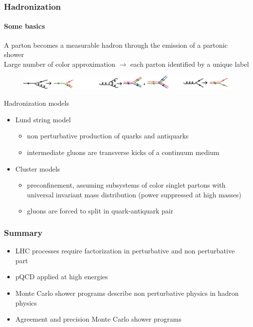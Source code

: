 \documentclass[aspectratio=43]{beamer}
\begin{document}
\begin{frame}
	
	\frametitle{Hadronization}
	\framesubtitle{Some basics}

	\footnotesize A parton becomes a measurable hadron through the emission of a partonic shower \\
	\footnotesize Large number of color approximation $\rightarrow$ each parton identified by a unique label \\

	\begin{figure}
		\includegraphics[width = 8.5 cm]{plots/hadronization.png}
	\end{figure}

	\footnotesize Hadronization models
	\begin{itemize}
		\item Lund string model
		\begin{itemize}
			\item \footnotesize non perturbative production of quarks and antiquarks
			\item \footnotesize intermediate gluons are transverse kicks of a continuum medium
		\end{itemize}
		\item Cluster models
		\begin{itemize}
			\item \footnotesize preconfinement, assuming subsystems of color singlet partons
			with universal invariant mass distribution (power suppressed at high masses)
			\item gluons are forced to split in quark-antiquark pair
		\end{itemize}
	\end{itemize}

\end{frame}

\begin{frame}

	\frametitle{Summary}

\begin{itemize}
	\item \footnotesize LHC processes require factorization in perturbative and non perturbative part
	\item \footnotesize pQCD applied at high energies
	\item \footnotesize Monte Carlo shower programs describe non perturbative physics in hadron physics
	\item \footnotesize Agreement and precision Monte Carlo shower programs
\end{itemize}

\end{frame}
\end{document}
